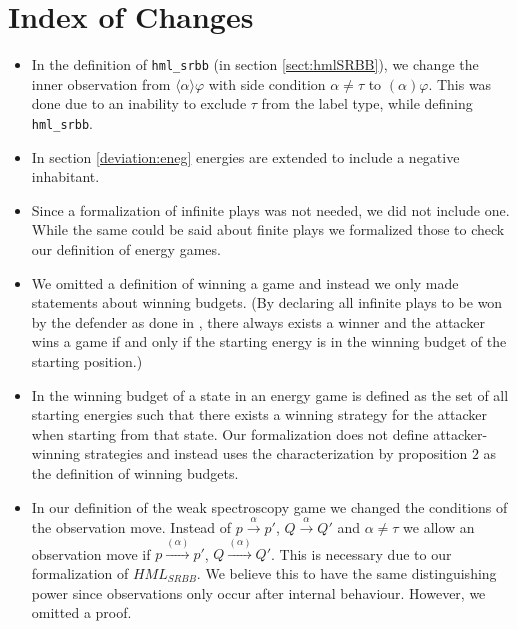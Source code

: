 \section{Index of Changes}
\begin{itemize}
    \item In the definition of \texttt{hml\_srbb} (in section \ref{sect:hmlSRBB}), we change the inner observation from
    $\langle\alpha\rangle\varphi$ with side condition $\alpha \neq \tau$ to $(\alpha)\varphi$.
    This was done due to an inability to exclude $\tau$ from the label type, while defining \texttt{hml\_srbb}. 
    
    \item In section \ref{deviation:eneg} energies are extended to include a negative inhabitant. 
    
    \item Since a formalization of infinite plays was not needed, we did not include one. While the 
    same could be said about finite plays we formalized those to check our definition of energy games.
    
    \item We omitted a definition of winning a game and instead we only made statements about winning budgets. 
    (By declaring all infinite plays to be won by the defender as done in \cite{bisping2023lineartimebranchingtime}, 
    there always exists a winner and the attacker wins a game if and only if the starting energy is in the winning budget of the starting position.)
    
    \item In \cite{bisping2023lineartimebranchingtime} the winning budget of a state in an energy game 
    is defined as the set of all starting energies such that there exists a winning strategy for the attacker 
    when starting from that state. Our formalization does not define attacker-winning strategies and instead 
    uses the characterization by proposition $2$ \cite[p. 9]{bisping2023lineartimebranchingtime} as the definition of winning budgets.
    
    \item In our definition of the weak spectroscopy game we changed the conditions of the observation move. 
    Instead of $p \overset{\alpha}{\longrightarrow}p'$, $Q \overset{\alpha}{\longrightarrow} Q'$ and $\alpha \neq \tau$
    we allow an observation move if  $p \overset{(\alpha)}{\longrightarrow}p'$, $Q \overset{(\alpha)}{\longrightarrow} Q'$.
    This is necessary due to our formalization of $HML_{SRBB}$. We believe this to have the same distinguishing power 
    since observations only occur after internal behaviour. However, we omitted a proof. 
    

\end{itemize}
